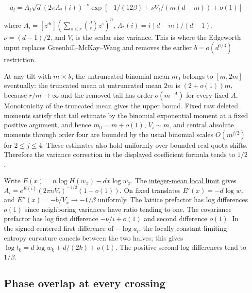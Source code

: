 \begin{equation*}
a_i=A_i\sqrt d(2\pi\Lambda_*(i))^{-\nu}
  \exp[-1/(12\beta)+\nu V_i/(m(d-m))+o(1)]
\end{equation*}

where $A_i=[z^{di}](\sum_{s\le r}\binom ds z^s)^n$, $\Lambda_*(i)=i(d-m)/(d-1)$, $\nu=(d-1)/2$, and $V_i$ is the scalar size variance. This is where the Edgeworth input replaces Greenhill--McKay--Wang and removes the earlier $b=o(d^{1/3})$ restriction.

At any tilt with $m\asymp b$, the untruncated binomial mean $m_0$ belongs to $[m,2m]$ eventually: the truncated mean at untruncated mean $2m$ is $(2+o(1))m$, because $r/m\to\infty$ and the removed tail has order $o(m^{-A})$ for every fixed $A$. Monotonicity of the truncated mean gives the upper bound. Fixed raw deleted moments satisfy that tail estimate by the binomial exponential moment at a fixed positive argument, and hence $m_0=m+o(1)$, $V_i\sim m$, and central absolute moments through order four are bounded by the usual binomial scales $O(m^{j/2})$ for $2\le j\le4$. These estimates also hold uniformly over bounded real quota shifts. Therefore the variance correction in the displayed coefficient formula tends to $1/2$.

Write $E(x)=n\log H(w_x)-dx\log w_x$. The \href{https://github.com/ProgramComputer/open-math-research/blob/78e9ef2c0c0b7a5daed126efbe12a46d030d8200/topics/balanced-arrays/dense-regime/uniform-lattice-lemma.md}{integer-mean local limit} gives $A_i=e^{E(i)}(2\pi nV_i)^{-1/2}(1+o(1))$. On fixed translates $E'(x)=-d\log w_x$ and $E''(x)=-b/V_x\to-1/\beta$ uniformly. The lattice prefactor has log differences $o(1)$ since neighboring variances have ratio tending to one. The covariance prefactor has log first difference $-\nu/i+o(1)$ and second difference $o(1)$. In the signed centered first difference of $-\log a_i$, the locally constant limiting entropy curvature cancels between the two halves; this gives $\log t_k=d\log w_k+d/(2k)+o(1)$. The positive second log differences tend to $1/\beta$.

\subsection{Phase overlap at every crossing}

